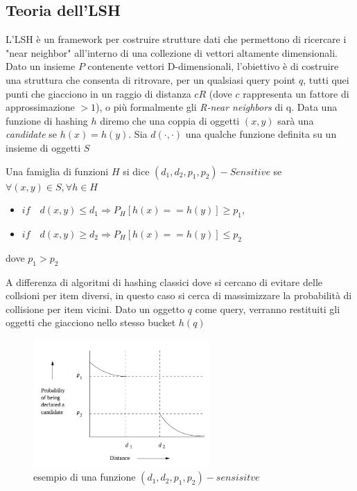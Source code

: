 \documentclass[a4paper,12pt]{report}
\begin{document}
\subsection{Teoria dell'LSH}
 L'LSH è un framework per costruire strutture dati che permettono di ricercare i "near neighbor" all'interno di una collezione di vettori altamente dimensionali.  Dato un insieme $P$ contenente vettori D-dimensionali, l'obiettivo è di costruire una struttura che consenta di ritrovare, per un qualsiasi query point $q$, tutti quei punti che giacciono in un raggio di distanza $cR$ (dove $c$ rappresenta un fattore di approssimazione $>1$), o più formalmente gli \emph{R-near neighbors} di q.
 Data una funzione di hashing $h$ diremo che una coppia di oggetti $(x,y)$ sarà una \emph{candidate}   se $h(x)=h(y)$. Sia $d(\cdot,\cdot)$ una qualche funzione  definita su un insieme di oggetti $S$
\begin{definizione} 


Una famiglia di funzioni $H$ si dice $(d_1,d_2,p_1,p_2)-Sensitive$ se  $\forall (x,y) \in S ,\forall h \in H $ 
\begin{itemize}
\item $if \quad  d(x,y)\leq d_1 \Rightarrow P_H[h(x)==h(y)]\geq p_1  $,
\item $if \quad  d(x,y)\geq d_2 \Rightarrow P_H[h(x)==h(y)]\leq p_2  $
\end{itemize}
dove $p_1>p_2$
\end{definizione}
A differenza di algoritmi di hashing classici dove si cercano di evitare delle collsioni per item diversi, in questo caso si cerca di massimizzare la probabilità di collisione per item vicini.
Dato un oggetto $q$ come query, verranno restituiti gli oggetti che giacciono nello stesso bucket $h(q)$
 

\begin{figure}[h]
\centering
\includegraphics[width=0.6\textwidth]{hashFamily.png}
\caption{esempio di una funzione $(d_1,d_2,p_1,p_2)-sensisitve$}
\label{fig:lshfamily}
\end{figure} 
 
\end{document}
